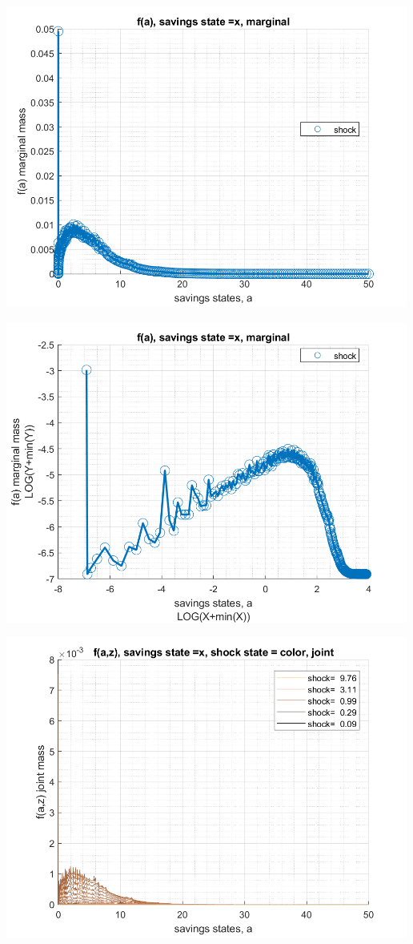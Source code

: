\documentclass[
]{book}
\begin{document}
\includegraphics[width=5.20833in,height=\textheight]{img/fx_ds_az_loop_images/figure_12.png}

\includegraphics[width=5.20833in,height=\textheight]{img/fx_ds_az_loop_images/figure_13.png}

\includegraphics[width=5.20833in,height=\textheight]{img/fx_ds_az_loop_images/figure_14.png}
\end{document}
